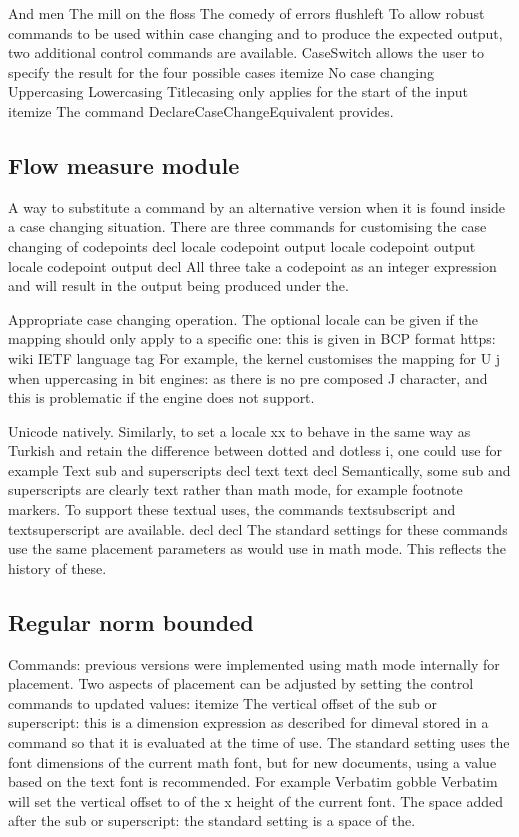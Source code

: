 \documentclass{article}
\begin{document}
And men The mill on the floss The comedy of errors flushleft To allow robust commands to be used within case changing and to produce the expected output, two additional control commands are available. CaseSwitch allows the user to specify the result for the four possible cases itemize No case changing Uppercasing Lowercasing Titlecasing only applies for the start of the input itemize The command DeclareCaseChangeEquivalent provides.

\subsection{Flow measure module}
A way to substitute a command by an alternative version when it is found inside a case changing situation. There are three commands for customising the case changing of codepoints decl locale codepoint output locale codepoint output locale codepoint output decl All three take a codepoint as an integer expression and will result in the output being produced under the.

Appropriate case changing operation. The optional locale can be given if the mapping should only apply to a specific one: this is given in BCP format https: wiki IETF language tag For example, the kernel customises the mapping for U j when uppercasing in bit engines: as there is no pre composed J character, and this is problematic if the engine does not support.

Unicode natively. Similarly, to set a locale xx to behave in the same way as Turkish and retain the difference between dotted and dotless i, one could use for example Text sub and superscripts decl text text decl Semantically, some sub and superscripts are clearly text rather than math mode, for example footnote markers. To support these textual uses, the commands textsubscript and textsuperscript are available. decl decl The standard settings for these commands use the same placement parameters as would use in math mode. This reflects the history of these.

\subsection{Regular norm bounded}
Commands: previous versions were implemented using math mode internally for placement. Two aspects of placement can be adjusted by setting the control commands to updated values: itemize The vertical offset of the sub or superscript: this is a dimension expression as described for dimeval stored in a command so that it is evaluated at the time of use. The standard setting uses the font dimensions of the current math font, but for new documents, using a value based on the text font is recommended. For example Verbatim gobble Verbatim will set the vertical offset to of the x height of the current font. The space added after the sub or superscript: the standard setting is a space of the.
\end{document}
